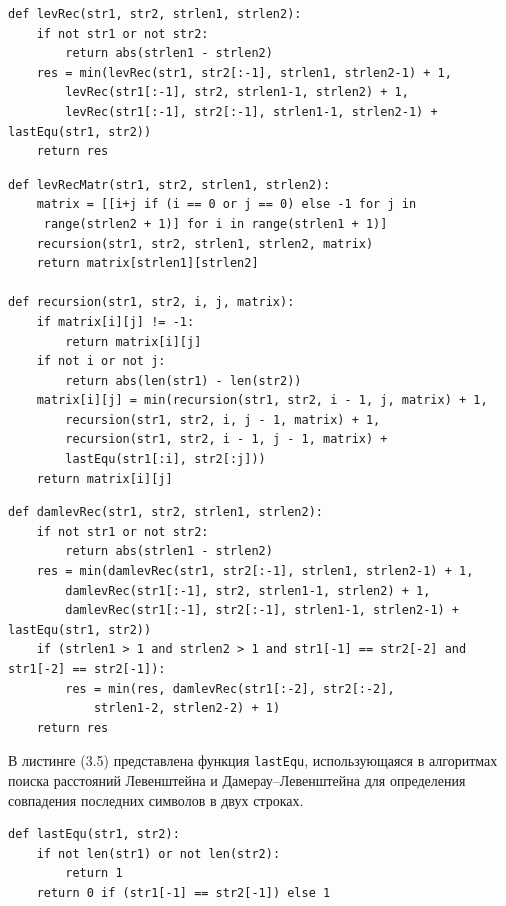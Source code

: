\documentclass[12pt, a4paper]{report}
\begin{document}
\begin{lstlisting}[title=Листинг 3.2~--- Расстояние Левенштейна рекурсией без кэша]
def levRec(str1, str2, strlen1, strlen2):
	if not str1 or not str2:
		return abs(strlen1 - strlen2)
	res = min(levRec(str1, str2[:-1], strlen1, strlen2-1) + 1,
		levRec(str1[:-1], str2, strlen1-1, strlen2) + 1,
		levRec(str1[:-1], str2[:-1], strlen1-1, strlen2-1) + lastEqu(str1, str2))
	return res
\end{lstlisting}

\newpage
\begin{lstlisting}[title=Листинг 3.3~--- Расстояние Левенштейна рекурсией с кэш-матрицей]
def levRecMatr(str1, str2, strlen1, strlen2):
	matrix = [[i+j if (i == 0 or j == 0) else -1 for j in
	 range(strlen2 + 1)] for i in range(strlen1 + 1)]
	recursion(str1, str2, strlen1, strlen2, matrix)
	return matrix[strlen1][strlen2]

def recursion(str1, str2, i, j, matrix):
	if matrix[i][j] != -1:
		return matrix[i][j]
	if not i or not j:
		return abs(len(str1) - len(str2))
	matrix[i][j] = min(recursion(str1, str2, i - 1, j, matrix) + 1,
		recursion(str1, str2, i, j - 1, matrix) + 1,
		recursion(str1, str2, i - 1, j - 1, matrix) +
		lastEqu(str1[:i], str2[:j]))
	return matrix[i][j]
\end{lstlisting}

\begin{lstlisting}[title=Листинг 3.4~--- Расстояние Дамерау--Левенштейна]
def damlevRec(str1, str2, strlen1, strlen2):
	if not str1 or not str2:
		return abs(strlen1 - strlen2)
	res = min(damlevRec(str1, str2[:-1], strlen1, strlen2-1) + 1,
		damlevRec(str1[:-1], str2, strlen1-1, strlen2) + 1,
		damlevRec(str1[:-1], str2[:-1], strlen1-1, strlen2-1) + lastEqu(str1, str2))
	if (strlen1 > 1 and strlen2 > 1 and str1[-1] == str2[-2] and str1[-2] == str2[-1]):
		res = min(res, damlevRec(str1[:-2], str2[:-2], 
			strlen1-2, strlen2-2) + 1)
	return res
\end{lstlisting}

В листинге (3.5) представлена функция \verb|lastEqu|, использующаяся в алгоритмах поиска расстояний Левенштейна и Дамерау--Левенштейна для определения совпадения последних символов в двух строках.

\newpage
\begin{lstlisting}[title=Листинг 3.5~--- Совпадение последних символов]
def lastEqu(str1, str2):
    if not len(str1) or not len(str2):
        return 1
    return 0 if (str1[-1] == str2[-1]) else 1
\end{lstlisting}
\end{document}
